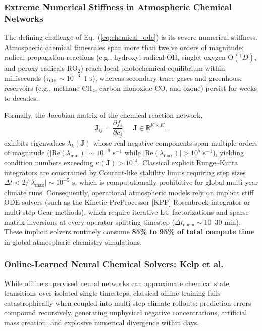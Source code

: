 \subsubsection{Extreme Numerical Stiffness in Atmospheric Chemical Networks}
The defining challenge of Eq.~(\ref{eq:chemical_ode}) is its severe numerical stiffness. Atmospheric chemical timescales span more than twelve orders of magnitude: radical propagation reactions (e.g., hydroxyl radical $\text{OH}$, singlet oxygen $\text{O}(^1D)$, and peroxy radicals $\text{RO}_2$) reach local photochemical equilibrium within milliseconds ($\tau_{\text{OH}} \sim 10^{-3}\text{--}1\text{ s}$), whereas secondary trace gases and greenhouse reservoirs (e.g., methane $\text{CH}_4$, carbon monoxide $\text{CO}$, and ozone) persist for weeks to decades. 

Formally, the Jacobian matrix of the chemical reaction network,
\begin{equation}
    \mathbf{J}_{ij} = \frac{\partial f_i}{\partial c_j}, \quad \mathbf{J} \in \mathbb{R}^{K \times K},
\end{equation}
exhibits eigenvalues $\lambda_k(\mathbf{J})$ whose real negative components span multiple orders of magnitude ($|\text{Re}(\lambda_{\min})| \sim 10^{-9}\text{ s}^{-1}$ while $|\text{Re}(\lambda_{\max})| > 10^5\text{ s}^{-1}$), yielding condition numbers exceeding $\kappa(\mathbf{J}) > 10^{14}$. Classical explicit Runge--Kutta integrators are constrained by Courant-like stability limits requiring step sizes $\Delta t < 2 / |\lambda_{\max}| \sim 10^{-5}\text{ s}$, which is computationally prohibitive for global multi-year climate runs. Consequently, operational atmospheric models rely on implicit stiff ODE solvers (such as the Kinetic PreProcessor [KPP] Rosenbrock integrator or multi-step Gear methods), which require iterative LU factorizations and sparse matrix inversions at every operator-splitting timestep ($\Delta t_{\text{chem}} \sim 10\text{--}30\text{ min}$). These implicit solvers routinely consume \textbf{85\% to 95\% of total compute time} in global atmospheric chemistry simulations.

\subsubsection{Online-Learned Neural Chemical Solvers: Kelp et al.}
While offline supervised neural networks can approximate chemical state transitions over isolated single timesteps, classical offline training fails catastrophically when coupled into multi-step climate rollouts: prediction errors compound recursively, generating unphysical negative concentrations, artificial mass creation, and explosive numerical divergence within days.

